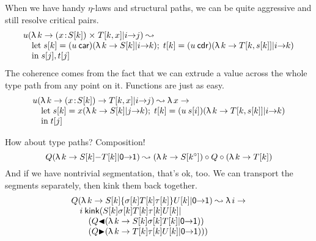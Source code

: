 \documentclass{article}
\begin{document}
When we have handy $\eta$-laws and structural paths, we can be quite aggressive and
still resolve critical pairs.
\[\begin{array}{l}
\xport{\LA k{\SG x{S\sbs k}{T\sbs{k,x}}}}iju \leadsto\\
\quad
\mbox{let}\;s\sbs k = \xport{\LA k{S\sbs k}}ik{(u\car)};
          \;t\sbs k = \xport{\LA k{T\sbs{k,s\sbs k}}}ik{(u\cdr)}\\
\quad
\mbox{in}\;s\sbs j,t\sbs j
\end{array}\]
The coherence comes from the fact that we can extrude a value across the whole
type path from any point on it. Functions are just as easy.
\[\begin{array}{l}
\xport{\LA k{\PI x{S\sbs k}{T\sbs{k,x}}}}iju \leadsto \LA x{}\\
\quad
\mbox{let}\;s\sbs k = \xport{\LA k{S\sbs k}}jkx;
          \;t\sbs k = \xport{\LA k{T\sbs{k,s\sbs k}}}ik{(u\:s\sbs i)}\\
\quad
\mbox{in}\;t\sbs j
\end{array}\]

How about type paths? Composition!
\[
\xport{\LA k{S\sbs k\da T\sbs k}}\PL\PR Q \leadsto
 (\LA k{S\sbs{\sy k}})\circ Q \circ (\LA k {T\sbs k})
\]
And if we have nontrivial segmentation, that's ok, too. We can transport the
segments separately, then kink them back together.
\[\begin{array}{l}
\xport{\LA k{S\sbs k\se{\sigma\sbs k T\sbs k\tau\sbs k}U\sbs k}}\PL\PR Q \leadsto
  \LA i{}\\
  \quad
  i\:\kink(S\sbs k \sigma\sbs k T\sbs k\tau\sbs kU\sbs k|\\
  \qquad    (\xport{\LA k{S\sbs k \sigma\sbs k T\sbs k}}\PL\PR{Q\SL}) \\
  \qquad    (\xport{\LA k{T\sbs k \tau\sbs k   U\sbs k}}\PL\PR{Q\SR}))
\end{array}\]
\end{document}
